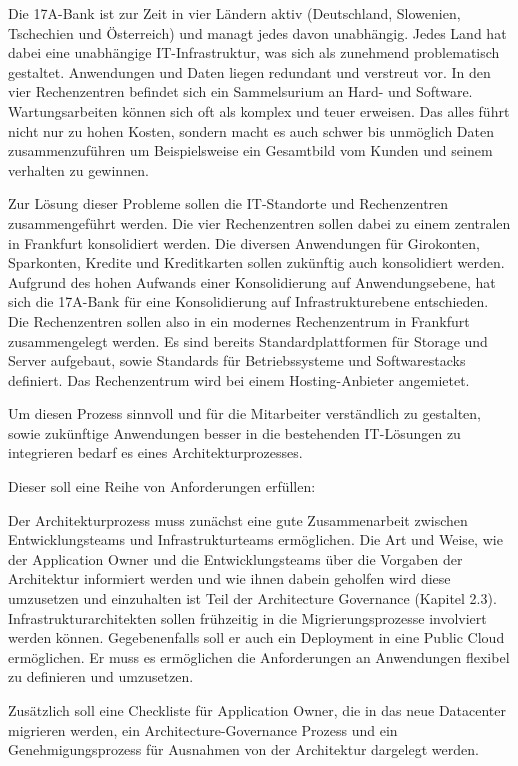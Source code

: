 Die 17A-Bank ist zur Zeit in vier Ländern aktiv (Deutschland, Slowenien, Tschechien und Österreich) und managt jedes davon unabhängig. Jedes Land hat dabei eine unabhängige IT-Infrastruktur, was sich als zunehmend problematisch gestaltet. Anwendungen und Daten liegen redundant und verstreut vor. In den vier Rechenzentren befindet sich ein Sammelsurium an Hard- und Software. Wartungsarbeiten können sich oft als komplex und teuer erweisen. Das alles führt nicht nur zu hohen Kosten, sondern macht es auch schwer bis unmöglich Daten zusammenzuführen um Beispielsweise ein Gesamtbild vom Kunden und seinem verhalten zu gewinnen. 

Zur Lösung dieser Probleme sollen die IT-Standorte und Rechenzentren zusammengeführt werden. Die vier Rechenzentren sollen dabei zu einem zentralen in Frankfurt konsolidiert werden. Die diversen Anwendungen für Girokonten, Sparkonten, Kredite und Kreditkarten sollen zukünftig auch konsolidiert werden. Aufgrund des hohen Aufwands einer Konsolidierung auf Anwendungsebene, hat sich die 17A-Bank für eine Konsolidierung auf Infrastrukturebene entschieden. Die Rechenzentren sollen also in ein modernes Rechenzentrum in Frankfurt zusammengelegt werden. Es sind bereits Standardplattformen für Storage und Server aufgebaut, sowie Standards für Betriebssysteme und Softwarestacks definiert. Das Rechenzentrum wird bei einem Hosting-Anbieter angemietet.

Um diesen Prozess sinnvoll und für die Mitarbeiter verständlich zu gestalten, sowie zukünftige Anwendungen besser in die bestehenden IT-Lösungen zu integrieren bedarf es eines Architekturprozesses.

Dieser soll eine Reihe von Anforderungen erfüllen:

Der Architekturprozess muss zunächst eine gute Zusammenarbeit zwischen Entwicklungsteams und Infrastrukturteams ermöglichen. Die Art und Weise, wie der Application Owner und die Entwicklungsteams über die Vorgaben der Architektur informiert werden und wie ihnen dabein geholfen wird diese umzusetzen und einzuhalten ist Teil der Architecture Governance (Kapitel 2.3). Infrastrukturarchitekten sollen frühzeitig in die Migrierungsprozesse involviert werden können. Gegebenenfalls soll er auch ein Deployment in eine Public Cloud ermöglichen. Er muss es ermöglichen die Anforderungen an Anwendungen flexibel zu definieren und umzusetzen.

Zusätzlich soll eine Checkliste für Application Owner, die in das neue Datacenter migrieren werden, ein Architecture-Governance Prozess und ein Genehmigungsprozess für Ausnahmen von der Architektur dargelegt werden.
